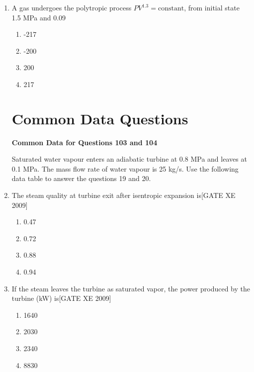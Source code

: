 \documentclass[journal,12pt,onecolumn]{IEEEtran}
\theoremstyle{remark}
\begin{document}
\begin{enumerate}
\item A gas undergoes the polytropic process $PV^{1.3} = \text{constant}$, from initial state 1.5 MPa and 0.09 %
\begin{multicols}{2}
\begin{enumerate}
    \item -217
    \item -200
    \item 200
    \item 217
\end{enumerate}
\end{multicols}


\section*{Common Data Questions}

\textbf{Common Data for Questions 103 and 104}

Saturated water vapour enters an adiabatic turbine at 0.8 MPa and leaves at 0.1 MPa. The mass flow rate of water vapour is 25 kg/s. Use the following data table to answer the questions 19 and 20.





\item The steam quality at turbine exit after isentropic expansion is\hfill[GATE XE 2009]
\begin{multicols}{2}
\begin{enumerate}
    \item 0.47
    \item 0.72
    \item 0.88
    \item 0.94
\end{enumerate}
\end{multicols}



\item If the steam leaves the turbine as saturated vapor, the power produced by the turbine (kW) is\hfill[GATE XE 2009]
\begin{multicols}{2}
\begin{enumerate}
    \item 1640
    \item 2030
    \item 2340
    \item 8830
\end{enumerate}
\end{multicols}




\end{enumerate}
\end{document}
